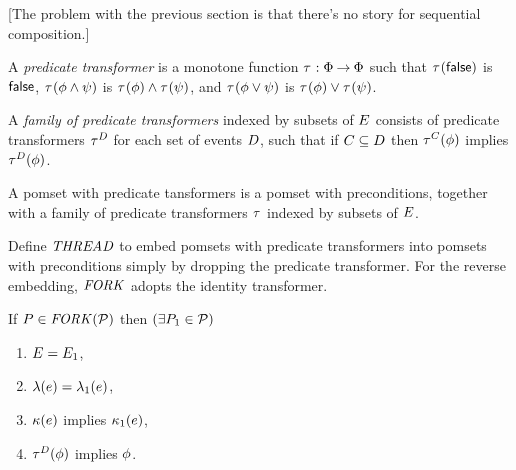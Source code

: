 [The problem with the previous section is that there's no story for sequential composition.]

\begin{definition}
  A \emph{predicate transformer} is a monotone function
  $\aTr:\Formulae\fun\Formulae$ such that
  $\aTr(\FALSE)$ is $\FALSE$,
  $\aTr(\aForm\land\bForm)$ is $\aTr(\aForm)\land\aTr(\bForm)$, and
  $\aTr(\aForm\lor\bForm)$ is $\aTr(\aForm)\lor\aTr(\bForm)$.
\end{definition}

\begin{definition}
  A \emph{family of predicate transformers}
  indexed by subsets of $\aEvs$
  consists of predicate transformers
  $\aTr[\bEvs]$ for each set of events $\bEvs$,
  such that if $\cEvs \subseteq \bEvs$
  then $\aTr[\cEvs](\aForm)$ implies $\aTr[\bEvs](\aForm)$.
\end{definition}

\begin{definition}
  A pomset with predicate tansformers is a pomset with preconditions,
  together with a family of predicate transformers $\aTr$ indexed by subsets
  of $\aEvs$.
\end{definition}


Define $\sTHREAD{}$ to embed pomsets with predicate transformers into pomsets with preconditions
simply by dropping the predicate transformer.
For the reverse embedding, $\sFORK{}$ adopts the identity transformer.
\begin{definition}
  If $\aPS\SB0 \in \sFORK{\aPSS}$ then
  $(\exists\aPS_1\in\aPSS)$
  \begin{enumerate}
  \item $\aEvs\SB0=\aEvs_1$,
  \item $\labelingAct\SB0(\aEv) = \labelingAct_1(\aEv)$,
  \item $\labelingForm\SB0(\aEv)$ implies $\labelingForm_1(\aEv)$, 
  \item $\aTr[\bEvs]\SB0(\aForm)$ implies $\aForm$.
  \end{enumerate}  
\end{definition}

